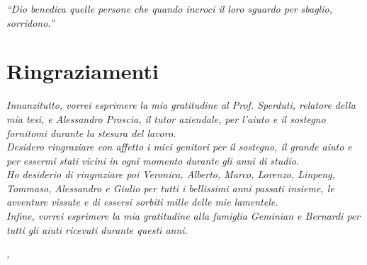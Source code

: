 
\cleardoublepage
{}
{}
\begin{flushright}{
	\slshape
	``Dio benedica quelle persone che quando incroci il loro sguardo per sbaglio, sorridono.''} \\
	\medskip
\end{flushright}


\bigskip

\begingroup
\let\clearpage\relax
\let\cleardoublepage\relax
\let\cleardoublepage\relax

\chapter*{Ringraziamenti}

\noindent \textit{Innanzitutto, vorrei esprimere la mia gratitudine al Prof. Sperduti, relatore della mia tesi, e Alessandro Proscia, il tutor aziendale, per l'aiuto e il sostegno fornitomi durante la stesura del lavoro.}\\

\noindent \textit{Desidero ringraziare con affetto i miei genitori per il sostegno, il grande aiuto e per essermi stati vicini in ogni momento durante gli anni di studio.}\\

\noindent \textit{Ho desiderio di ringraziare poi Veronica, Alberto, Marco, Lorenzo, Linpeng, Tommaso, Alessandro e Giulio per tutti i bellissimi anni passati insieme, le avventure vissute e di essersi sorbiti mille delle mie lamentele.}\\

\noindent \textit{Infine, vorrei esprimere la mia gratitudine alla famiglia Geminian e Bernardi per tutti gli aiuti ricevuti durante questi anni.}\\
\bigskip

\noindent\textit{\myLocation, \myTime}
\hfill \myName

\endgroup

